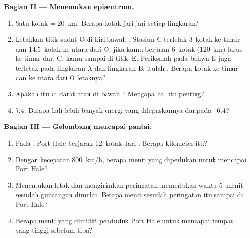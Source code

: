 \begin{problem}
\medskip
\noindent\textbf{Bagian II --- Menemukan episentrum.}\par\nopagebreak
\begin{enumerate}[resume, beginpenalty=10000]
  \item Satu kotak = \qty{20}{km}. Berapa kotak jari-jari setiap
        lingkaran?
  \item Letakkan titik sudut O di kiri bawah . Stasiun C terletak
        3~kotak ke timur dan 14.5~kotak ke utara dari O; jika kamu berjalan
        6~kotak (\qty{120}{km}) lurus ke timur dari C, kamu sampai di
        titik~E. Periksalah pada  bahwa E juga terletak pada lingkaran A
        dan lingkaran B: itulah . Berapa kotak ke timur dan ke
        utara dari O letaknya?
  \item Apakah  itu di darat atau di bawah ? Mengapa hal itu
        penting?
  \item {} 7.4. Berapa kali lebih banyak energi yang
        dilepaskannya daripada  ~6.4?
\end{enumerate}

\medskip
\noindent\textbf{Bagian III --- Gelombang mencapai pantai.}\par\nopagebreak
\begin{enumerate}[resume, beginpenalty=10000]
  \item Pada , Port Hale berjarak 12~kotak dari . Berapa
        kilometer itu?
  \item Dengan kecepatan \qty{800}{km/h}, berapa menit yang diperlukan
         untuk mencapai Port Hale?
  \item Menentukan letak  dan mengirimkan peringatan memerlukan
        waktu 5~menit sesudah guncangan dimulai. Berapa menit sesudah  peringatan itu sampai di Port Hale?
  \item Berapa menit yang dimiliki penduduk Port Hale untuk mencapai tempat
        yang tinggi sebelum  tiba?
\end{enumerate}
\end{problem}

